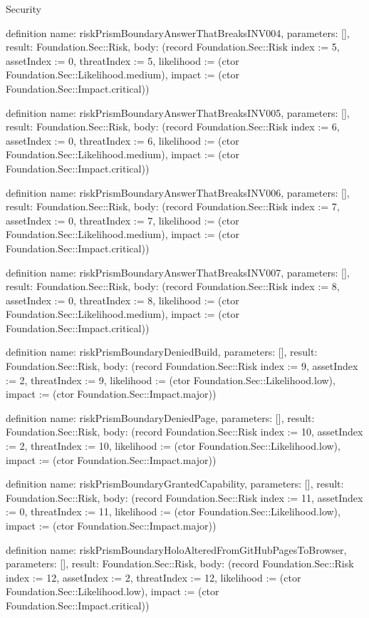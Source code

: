 \begin{lexlean}{Security}
\begin{semanticmodule}
definition{
  name: riskPrismBoundaryAnswerThatBreaksINV004,
  parameters: [],
  result: Foundation.Sec::Risk,
  body: (record Foundation.Sec::Risk {index := 5, assetIndex := 0, threatIndex := 5, likelihood := (ctor Foundation.Sec::Likelihood.medium), impact := (ctor Foundation.Sec::Impact.critical)})
}

definition{
  name: riskPrismBoundaryAnswerThatBreaksINV005,
  parameters: [],
  result: Foundation.Sec::Risk,
  body: (record Foundation.Sec::Risk {index := 6, assetIndex := 0, threatIndex := 6, likelihood := (ctor Foundation.Sec::Likelihood.medium), impact := (ctor Foundation.Sec::Impact.critical)})
}

definition{
  name: riskPrismBoundaryAnswerThatBreaksINV006,
  parameters: [],
  result: Foundation.Sec::Risk,
  body: (record Foundation.Sec::Risk {index := 7, assetIndex := 0, threatIndex := 7, likelihood := (ctor Foundation.Sec::Likelihood.medium), impact := (ctor Foundation.Sec::Impact.critical)})
}

definition{
  name: riskPrismBoundaryAnswerThatBreaksINV007,
  parameters: [],
  result: Foundation.Sec::Risk,
  body: (record Foundation.Sec::Risk {index := 8, assetIndex := 0, threatIndex := 8, likelihood := (ctor Foundation.Sec::Likelihood.medium), impact := (ctor Foundation.Sec::Impact.critical)})
}

definition{
  name: riskPrismBoundaryDeniedBuild,
  parameters: [],
  result: Foundation.Sec::Risk,
  body: (record Foundation.Sec::Risk {index := 9, assetIndex := 2, threatIndex := 9, likelihood := (ctor Foundation.Sec::Likelihood.low), impact := (ctor Foundation.Sec::Impact.major)})
}

definition{
  name: riskPrismBoundaryDeniedPage,
  parameters: [],
  result: Foundation.Sec::Risk,
  body: (record Foundation.Sec::Risk {index := 10, assetIndex := 2, threatIndex := 10, likelihood := (ctor Foundation.Sec::Likelihood.low), impact := (ctor Foundation.Sec::Impact.major)})
}

definition{
  name: riskPrismBoundaryGrantedCapability,
  parameters: [],
  result: Foundation.Sec::Risk,
  body: (record Foundation.Sec::Risk {index := 11, assetIndex := 0, threatIndex := 11, likelihood := (ctor Foundation.Sec::Likelihood.low), impact := (ctor Foundation.Sec::Impact.major)})
}

definition{
  name: riskPrismBoundaryHoloAlteredFromGitHubPagesToBrowser,
  parameters: [],
  result: Foundation.Sec::Risk,
  body: (record Foundation.Sec::Risk {index := 12, assetIndex := 2, threatIndex := 12, likelihood := (ctor Foundation.Sec::Likelihood.low), impact := (ctor Foundation.Sec::Impact.critical)})
}


\end{semanticmodule}
\end{lexlean}
